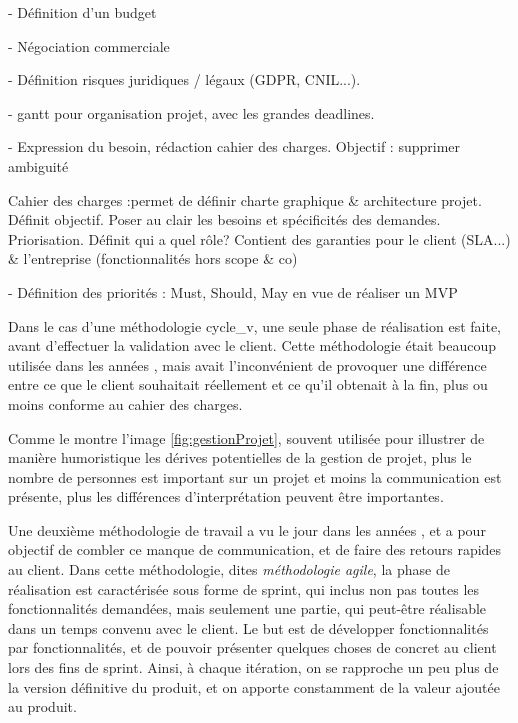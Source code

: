 

- Définition d'un budget

- Négociation commerciale

- Définition risques juridiques / légaux (GDPR, CNIL...).

- \gls{gantt} pour organisation projet, avec les grandes deadlines.

- Expression du besoin, rédaction cahier des charges. Objectif : supprimer ambiguité

Cahier des charges :permet de définir charte graphique \& architecture projet. Définit objectif. Poser au clair les besoins et spécificités des demandes. Priorisation. Définit qui a quel rôle? Contient des garanties pour le client (SLA...) \& l'entreprise (fonctionnalités hors scope \& co)

- Définition des priorités : Must, Should, May en vue de réaliser un MVP

Dans le cas d'une méthodologie \gls{cycle_v}, une seule phase de réalisation est faite, avant d'effectuer la validation avec le client. Cette méthodologie était beaucoup utilisée dans les années , mais avait l'inconvénient de provoquer une différence entre ce que le client souhaitait réellement et ce qu'il obtenait à la fin, plus ou moins conforme au cahier des charges. 


Comme le montre l'image \ref{fig:gestionProjet}, souvent utilisée pour illustrer de manière humoristique les dérives potentielles de la gestion de projet, plus le nombre de personnes est important sur un projet et moins la communication est présente, plus les différences d'interprétation peuvent être importantes. 

Une deuxième méthodologie de travail a vu le jour dans les années , et a pour objectif de combler ce manque de communication, et de faire des retours rapides au client. Dans cette méthodologie, dites \emph{méthodologie agile}, la phase de réalisation est caractérisée sous forme de sprint, qui inclus non pas toutes les fonctionnalités demandées, mais seulement une partie, qui peut-être réalisable dans un temps convenu avec le client. Le but est de développer fonctionnalités par fonctionnalités, et de pouvoir présenter quelques choses de concret au client lors des fins de sprint. Ainsi, à chaque itération, on se rapproche un peu plus de la version définitive du produit, et on apporte constamment de la valeur ajoutée au produit.

